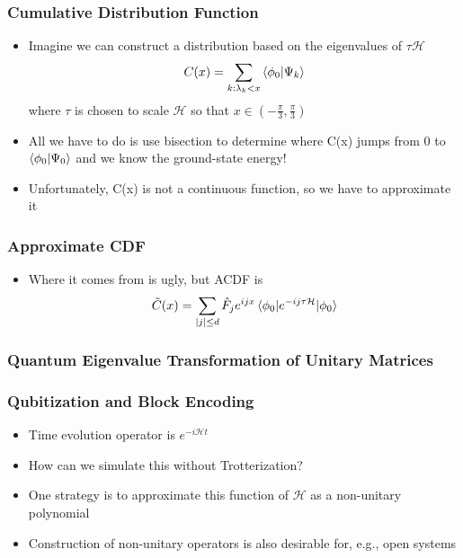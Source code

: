 \documentclass[aspectratio=169]{beamer}
\begin{document}
\begin{frame}
\frametitle{Cumulative Distribution Function}
\begin{itemize}[<+->]
\item Imagine we can construct a distribution based on the eigenvalues of $\tau\mathcal{H}$
\begin{equation}\nonumber
C(x) = \sum_{k:\lambda_k<x}\braket{\phi_0|\Psi_k}
\end{equation}
where $\tau$ is chosen to scale $\mathcal{H}$ so that $x\in (-\frac{\pi}{3},\frac{\pi}{3})$
\item All we have to do is use bisection to determine where C(x) jumps from 0 to $\braket{\phi_0|\Psi_0}$ and we know the ground-state energy!
\item Unfortunately, C(x) is not a continuous function, so we have to approximate it
\end{itemize}
\end{frame}

\begin{frame}
\frametitle{Approximate CDF}
\begin{itemize}[<+->]
\item Where it comes from is ugly, but ACDF is
\begin{equation}\nonumber
\tilde{C}(x) = \sum_{|j|\leq d}\hat{F}_j e^{ijx}\braket{\phi_0|e^{-ij\tau \mathcal{H}}|\phi_0}
\end{equation}
\end{itemize}
\end{frame}

\begin{frame}
\frametitle{Quantum Eigenvalue Transformation of Unitary Matrices}
\end{frame}

\begin{frame}
	\frametitle{Qubitization and Block Encoding }
	\begin{itemize}[<+->]
	\item Time evolution operator is $e^{-i\mathcal{H}t}$
	\item How can we simulate this without Trotterization?
	\item One strategy is to approximate this function of $\mathcal{H}$ as a non-unitary polynomial
	\item Construction of non-unitary operators is also desirable for, e.g., open systems	
	\end{itemize}

\end{frame}
\end{document}
